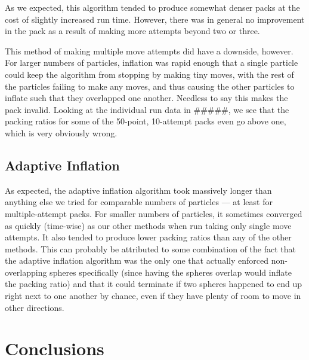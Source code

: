 \documentclass[twocolumn,10pt]{article}
\begin{document}
As we expected, this algorithm tended to produce somewhat denser packs at the
cost of slightly increased run time. However, there was in general no
improvement in the pack as a result of making more attempts beyond two or
three.

This method of making multiple move attempts did have a downside, however. For
larger numbers of particles, inflation was rapid enough that a single particle
could keep the algorithm from stopping by making tiny moves, with the rest of
the particles failing to make any moves, and thus causing the other particles
to inflate such that they overlapped one another. Needless to say this makes
the pack invalid. Looking at the individual run data in \#\#\#\#\#, we see
that the packing ratios for some of the 50-point, 10-attempt packs even go
above one, which is very obviously wrong.

\subsection*{Adaptive Inflation}

As expected, the adaptive inflation algorithm took massively longer than
anything else we tried for comparable numbers of particles --- at least for
multiple-attempt packs. For smaller numbers of particles, it sometimes
converged as quickly (time-wise) as our other methods when run taking only
single move attempts. It also tended to produce lower packing ratios than any
of the other methods. This can probably be attributed to some combination of
the fact that the adaptive inflation algorithm was the only one that actually
enforced non-overlapping spheres specifically (since having the spheres
overlap would inflate the packing ratio) and that it could terminate if two
spheres happened to end up right next to one another by chance, even if they
have plenty of room to move in other directions.


\section*{Conclusions}
\end{document}

